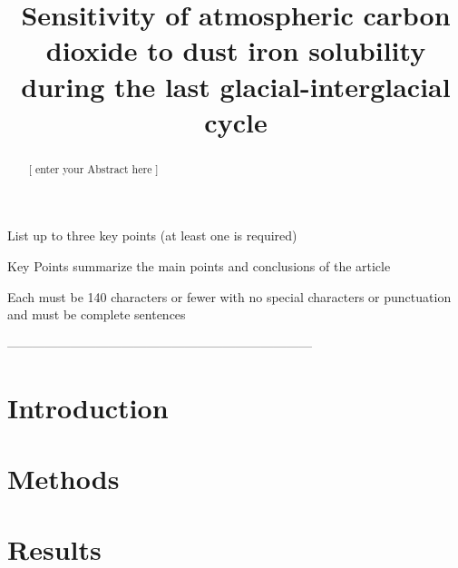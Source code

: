 \documentclass[draft]{agujournal2019}
\begin{document}
\title{Sensitivity of atmospheric carbon dioxide to dust iron
solubility during the last glacial-interglacial cycle}







\begin{keypoints}
\item	List up to three key points (at least one is required)
\item	Key Points summarize the main points and conclusions of the article
\item	Each must be 140 characters or fewer with no special characters or punctuation and must be complete sentences
\end{keypoints}


\begin{abstract}
[ enter your Abstract here ]
\end{abstract}

------------------------------------------------------------------------ %
%
%
\section{Introduction}



\section{Methods}



\section{Results}


\end{document}
